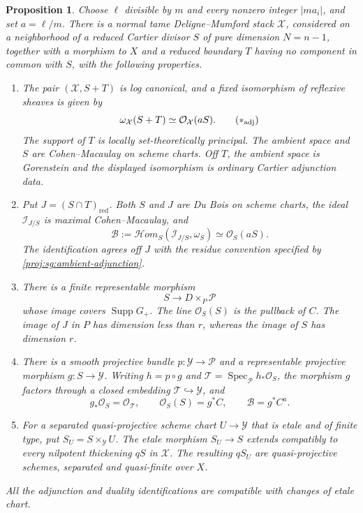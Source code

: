 \documentclass[11pt,letterpaper]{article}
\newcommand{\OO}{\mathcal{O}}
\DeclareMathOperator{\Spec}{Spec}
\DeclareMathOperator{\Supp}{Supp}
\newtheorem{proposition}[theorem]{Proposition}
\theoremstyle{definition}
\theoremstyle{remark}
\begin{document}
\begin{proposition}\label{proj:prop:signed-construction}
Choose $\ell$ divisible by $m$ and every nonzero integer $|ma_i|$,
and set $a=\ell/m$.  There is a normal tame Deligne--Mumford stack
$\mathcal X$, considered on a neighborhood of a reduced Cartier
divisor $S$ of pure dimension $N=n-1$, together with a morphism
to $X$ and a reduced boundary
$T$ having no component in common with $S$, with the following
properties.
\begin{enumerate}[label=\textup{(\roman*)}]
\item
The pair $(\mathcal X,S+T)$ is log canonical, and a fixed
isomorphism of reflexive sheaves is given by
\[
 \omega_{\mathcal X}(S+T)\simeq\OO_{\mathcal X}(aS).
 \tag{\(\ast_{\mathrm{adj}}\)}\label{proj:sg:ambient-adjunction}
\]
The support of $T$ is locally set-theoretically principal.
The ambient space and $S$ are Cohen--Macaulay on scheme charts.
Off $T$, the ambient space is Gorenstein and the displayed
isomorphism is ordinary Cartier adjunction data.

\item
Put $J=(S\cap T)_{\mathrm{red}}$.  Both $S$ and $J$ are Du Bois
on scheme charts, the ideal $\mathcal I_{J/S}$ is maximal
Cohen--Macaulay, and
\[
 \mathcal B:=
 \mathcal Hom_S(\mathcal I_{J/S},\omega_S)
 \simeq\OO_S(aS).
\]
The identification agrees off $J$ with the residue convention
specified by \eqref{proj:sg:ambient-adjunction}.

\item
There is a finite representable morphism
\[
 S\longrightarrow D\times_P\mathcal P
\]
whose image covers $\Supp G_+$.  The line $\OO_S(S)$ is the pullback
of $C$.  The image of $J$ in $P$ has dimension less than $r$,
whereas the image of $S$ has dimension $r$.

\item
There is a smooth projective bundle $p:\mathcal Y\to\mathcal P$
and a representable projective morphism $g:S\to\mathcal Y$.
Writing $h=p\circ g$ and
$\mathcal T=\Spec_{\mathcal P}h_*\OO_S$, the morphism $g$ factors
through a closed embedding $\mathcal T\hookrightarrow\mathcal Y$,
and
\[
 g_*\OO_S=\OO_{\mathcal T},\qquad
 \OO_S(S)=g^*C,\qquad \mathcal B=g^*C^a.
\]

\item
For a separated quasi-projective scheme chart
$U\to\mathcal Y$ that is etale and of finite type, put
$S_U=S\times_{\mathcal Y}U$.
The etale morphism $S_U\to S$ extends compatibly to every
nilpotent thickening $qS$ in $\mathcal X$.
The resulting $qS_U$ are quasi-projective schemes, separated
and quasi-finite over $X$.
\end{enumerate}
All the adjunction and duality identifications are compatible
with changes of etale chart.
\end{proposition}
\end{document}
